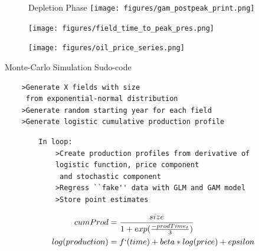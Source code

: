 \documentclass{beamer}
\begin{document}
\begin{frame}[plain]
	\begin{figure}
	Depletion Phase
	\texttt{[image: figures/gam\_postpeak\_print.png]}
	\label{gam_postpeak_pres}
	\end{figure}
\end{frame}

\begin{frame}[plain]
	\begin{figure}
		\texttt{[image: figures/field\_time\_to\_peak\_pres.png]}		
		\label{field_time_to_peak}
	\end{figure}
\end{frame}



\begin{frame}
\begin{figure}
	\texttt{[image: figures/oil\_price\_series.png]}
	\label{oil_price_series}	
\end{figure}
\end{frame}


\begin{frame}
Monte-Carlo Simulation Sudo-code
	\begin{verbatim}
	>Generate X fields with size
	 from exponential-normal distribution
	>Generate random starting year for each field
	>Generate logistic cumulative production profile
	\end{verbatim}
\end{frame}

\begin{frame}
	\begin{verbatim}
		In loop:
			>Create production profiles from derivative of
			logistic function, price component
			 and stochastic component
			>Regress ``fake'' data with GLM and GAM model
			>Store point estimates
	\end{verbatim}
\end{frame}

\begin{frame}
	\begin{equation}
		\begin{split}
		cumProd&=\frac{size}{1+exp(\frac{-prodTime_t}{3})} \\
		log(production) &= f`(time) + beta*log(price) + epsilon
		\end{split}
	\end{equation}
\end{frame}
\end{document}
